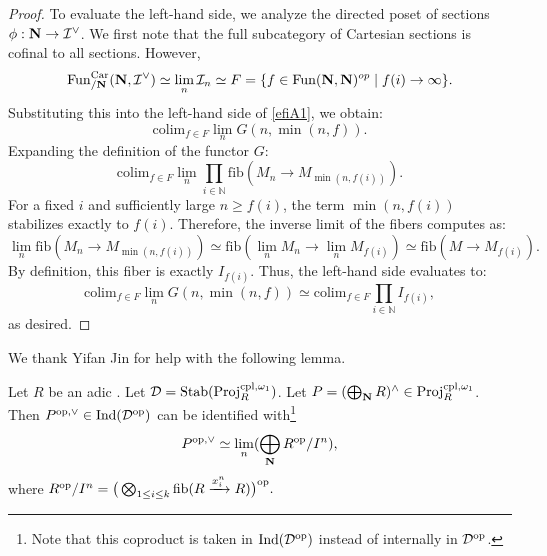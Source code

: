 \documentclass[a4paper,10pt, oneside]{amsart}
\begin{document}
\begin{proof}
	To evaluate the left-hand side, we analyze the directed poset of sections
	\(\phi: \mathbf{N} \to \mathcal{I}^\vee\). We first note that the full subcategory of Cartesian sections is cofinal to all sections. However, $$\operatorname{Fun}^{\mathrm{Car}}_{/\mathbf{N}}(\mathbf{N},\mathcal{I}^\vee)\simeq\lim_n \mathcal{I}_n\simeq 	F =
	\{f \in \mathrm{Fun}(\mathbf{N}, \mathbf{N})^{op} \mid f(i) \to \infty\}.
	$$
	Substituting this into the left-hand side of \cref{efiA1}, we obtain:
	\[
	\mathrm{colim}_{f \in F}
	\lim_n G(n, \min(n, f)).
	\]
	Expanding the definition of the functor \(G\):
	\[
	\mathrm{colim}_{f \in F}
	\lim_n
	\prod_{i \in \mathbb{N}}
	\mathrm{fib}(M_n \to M_{\min(n, f(i))}).
	\]
 For a fixed \(i\) and sufficiently large \(n \geq f(i)\), the term
	\(\min(n, f(i))\) stabilizes exactly to \(f(i)\). Therefore, the inverse limit of the fibers computes as:
	\[
	\lim_n
	\mathrm{fib}(M_n \to M_{\min(n, f(i))})
	\simeq
	\mathrm{fib}\left(\lim_n M_n \to \lim_n M_{f(i)}\right)
	\simeq
	\mathrm{fib}(M \to M_{f(i)}).
	\]
	By definition, this fiber is exactly \(I_{f(i)}\). Thus, the left-hand side evaluates to:
	\[
		\mathrm{colim}_{f \in F}
	\lim_n G(n, \min(n, f))
	\simeq
	\mathrm{colim}_{f \in F}
	\prod_{i \in \mathbb{N}} I_{f(i)},
	\]
	as desired.
\end{proof}
We thank Yifan Jin for help with the following lemma.
\begin{lem}\label{formulapopvee}
	Let $R$ be an adic \einfring. Let  $\mathcal{D}=\mathrm{Stab}(\mathrm{Proj}_R^{\mathrm{cpl},\omega_1})$. Let $P=(\bigoplus_{\mathbf{N}} R)^{\wedge}\in \mathrm{Proj}_R^{\mathrm{cpl},\omega_1}$. Then $P^{\mathrm{op},\vee}\in \mathrm{Ind}(\mathcal{D}^{\mathrm{op}})$ can be identified with\footnote{Note that this  coproduct is taken in $\mathrm{Ind}(\mathcal{D}^{\mathrm{op}})$ instead of internally in $\mathcal{D}^{\mathrm{op}}$.} $$P^{\mathrm{op},\vee}\simeq \lim_n (\bigoplus_{\mathbf{N}} R^{\mathrm{op}}/I^n),$$
	where $R^{\mathrm{op}}/I^n=\big(\bigotimes_{1\leq i\leq k}\mathrm{fib}(R\xrightarrow{x_i^n}R)\big)^{\mathrm{op}}.$
\end{lem}
\end{document}
